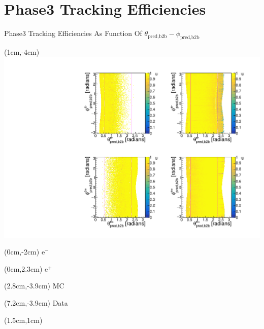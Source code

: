 \documentclass[8pt]{beamer}
\begin{document}
\section{Phase3 Tracking Efficiencies}

\begin{frame}{Phase3 Tracking Efficiencies As Function Of $\theta_{\textrm{pred,b2b}}-\phi_{\textrm{pred,b2b}}$}
	
	
	
	\begin{textblock*}{9cm}(1cm,-4cm)
		\includegraphics[width=\textwidth]{VPlots/P3/xCEffTP_MCDataP3}
	\end{textblock*}
	
	\begin{textblock*}{2cm}(0cm,-2cm)
		$\textrm{e}^-$
	\end{textblock*}
	
	\begin{textblock*}{2cm}(0cm,2.3cm)
		$\textrm{e}^+$
	\end{textblock*}
	
	
	\begin{textblock*}{2cm}(2.8cm,-3.9cm)
		MC
	\end{textblock*}
	
	\begin{textblock*}{2cm}(7.2cm,-3.9cm)
		Data
	\end{textblock*}
	
	
	\begin{textblock*}{8cm}(1.5cm,1cm)
\end{textblock*}
\end{frame}
\end{document}

